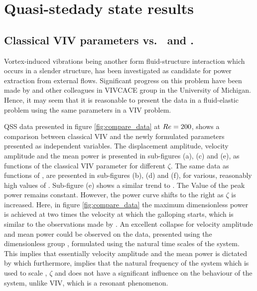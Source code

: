 \section{Quasi-stedady state results} 

\subsection{Classical VIV parameters vs. \massstiff \ and \massdamp.}


Vortex-induced vibrations being another form fluid-structure interaction which occurs in a slender structure, has been investigated as candidate for power extraction from external flows. Significant progress on this problem have been made by \cite{Bernitsas2008a-concept,Bernitsas2009,Raghavan2010a,Lee2011b} and other colleagues in VIVCACE group in the University of Michigan. Hence, it may seem that it is reasonable to present the data in a fluid-elastic problem using the same parameters in a VIV problem.



QSS data presented in figure \ref{fig:compare_data} at $Re=200$, shows a comparison between classical VIV and the newly formulated parameters presented as independent variables. The displacement amplitude, velocity amplitude and the mean power is presented in sub-figures (a), (c) and (e), as functions of the classical VIV parameter \ustar for different $\zeta$. The same data as functions of \massdamp, are presented in sub-figures (b), (d) and (f), for various, reasonably high values of \massstiff {}. Sub-figure (e) shows a similar trend to \cite{Barrero-Gil2010a}. The Value of the peak power remains constant. However, the power curve shifts to the right as $\zeta$ is increased. Here, in figure \ref{fig:compare_data} the maximum dimensionless power is achieved at two times the velocity at which the galloping starts, which is similar to the observations made by \citet{Barrero-Gil2010a,vicente-Ludlam2014}. An excellent collapse for velocity amplitude and mean power could be observed on the data, presented using the dimensionless group \massdamp, formulated using the natural time scales of the system. This implies that essentially velocity amplitude and the mean power is dictated by \massdamp which furthermore, implies that the natural frequency of the system which is used to scale \ustar, $\zeta$ and \massstiff does not have a significant influence on the behaviour of the system, unlike VIV, which is a resonant phenomenon.  
 

